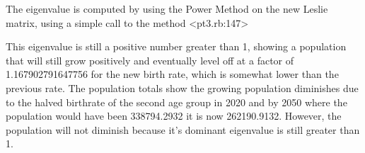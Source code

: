 \documentclass[letterpaper,11pt]{article}
\begin{document}
The eigenvalue is computed by using the Power Method on the new Leslie matrix, using a simple call to the method <pt3.rb:147>

This eigenvalue is still a positive number greater than 1, showing a population that will still grow positively and eventually
level off at a factor of 1.167902791647756 for the new birth rate, which is somewhat lower than the previous rate.
The population totals show the growing population diminishes due to the halved birthrate of the second age group in 2020 and by
2050 where the population would have been 338794.2932 it is now 262190.9132.
However, the population will not diminish because it's dominant eigenvalue is still greater than 1.
\end{document}
